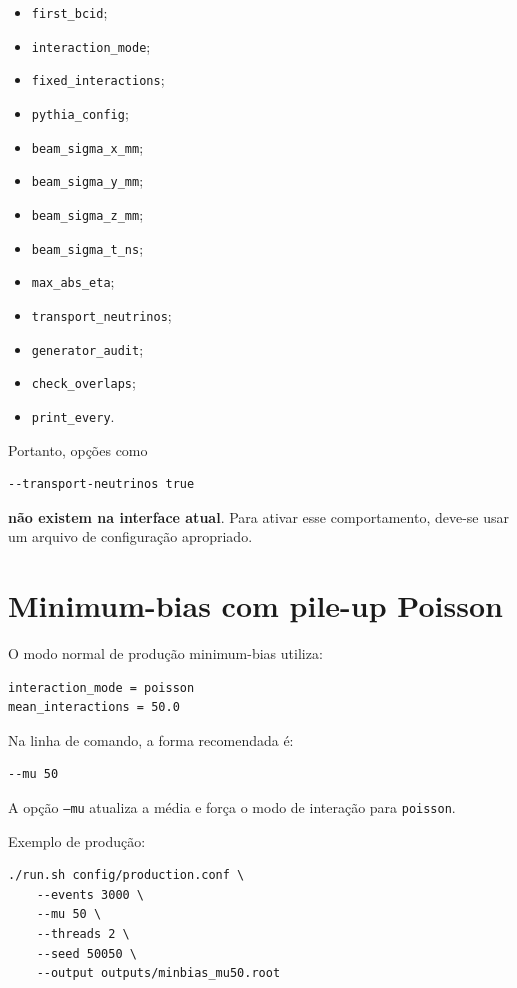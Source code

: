 \documentclass[11pt,a4paper]{article}
\begin{document}
\begin{itemize}
  \item \texttt{first\_bcid};
  \item \texttt{interaction\_mode};
  \item \texttt{fixed\_interactions};
  \item \texttt{pythia\_config};
  \item \texttt{beam\_sigma\_x\_mm};
  \item \texttt{beam\_sigma\_y\_mm};
  \item \texttt{beam\_sigma\_z\_mm};
  \item \texttt{beam\_sigma\_t\_ns};
  \item \texttt{max\_abs\_eta};
  \item \texttt{transport\_neutrinos};
  \item \texttt{generator\_audit};
  \item \texttt{check\_overlaps};
  \item \texttt{print\_every}.
\end{itemize}

Portanto, opções como

\begin{lstlisting}[style=shell]
--transport-neutrinos true
\end{lstlisting}

\textbf{não existem na interface atual}. Para ativar esse comportamento, deve-se
usar um arquivo de configuração apropriado.

\section{Minimum-bias com pile-up Poisson}

O modo normal de produção minimum-bias utiliza:

\begin{lstlisting}[style=config]
interaction_mode = poisson
mean_interactions = 50.0
\end{lstlisting}

Na linha de comando, a forma recomendada é:

\begin{lstlisting}[style=shell]
--mu 50
\end{lstlisting}

A opção \texttt{--mu} atualiza a média e força o modo de interação para
\texttt{poisson}.

Exemplo de produção:

\begin{lstlisting}[style=shell]
./run.sh config/production.conf \
    --events 3000 \
    --mu 50 \
    --threads 2 \
    --seed 50050 \
    --output outputs/minbias_mu50.root
\end{lstlisting}
\end{document}
